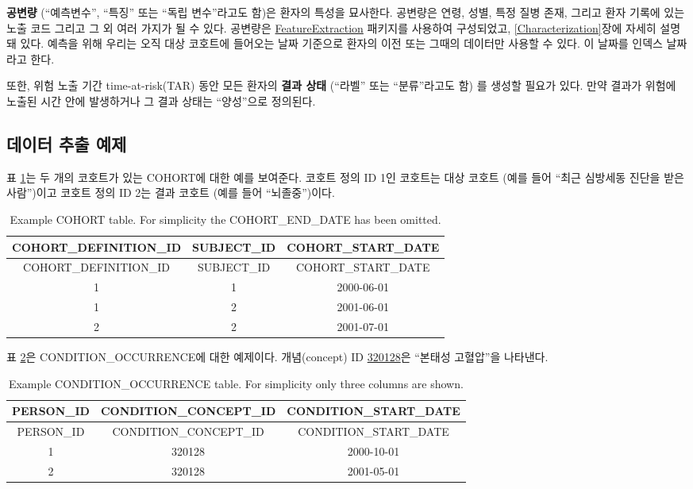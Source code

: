 \documentclass[10.5pt]{book}
\theoremstyle{definition}
\theoremstyle{definition}
\theoremstyle{definition}
\theoremstyle{remark}
\begin{document}
\textbf{공변량} (``예측변수'', ``특징'' 또는 ``독립 변수''라고도 함)은
환자의 특성을 묘사한다. 공변량은 연령, 성별, 특정 질병 존재, 그리고 환자
기록에 있는 노출 코드 그리고 그 외 여러 가지가 될 수 있다. 공변량은
\href{https://ohdsi.github.io/FeatureExtraction/}{FeatureExtraction}
패키지를 사용하여 구성되었고, \ref{Characterization}장에 자세히 설명돼
있다. 예측을 위해 우리는 오직 대상 코호트에 들어오는 날짜 기준으로
환자의 이전 또는 그때의 데이터만 사용할 수 있다. 이 날짜를 인덱스
날짜라고 한다.

또한, 위험 노출 기간 time-at-risk(TAR) 동안 모든 환자의 \textbf{결과
상태} (``라벨'' 또는 ``분류''라고도 함) 를 생성할 필요가 있다. 만약
결과가 위험에 노출된 시간 안에 발생하거나 그 결과 상태는 ``양성''으로
정의된다.  

\subsection{데이터 추출 예제}\label{--}

표 \ref{tab:plpExampleCohorts}는 두 개의 코호트가 있는 COHORT에 대한
예를 보여준다. 코호트 정의 ID 1인 코호트는 대상 코호트 (예를 들어 ``최근
심방세동 진단을 받은 사람'')이고 코호트 정의 ID 2는 결과 코호트 (예를
들어 ``뇌졸중'')이다.

\begin{longtable}[]{@{}ccc@{}}
\caption{\label{tab:plpExampleCohorts} Example COHORT table. For simplicity
the COHORT\_END\_DATE has been omitted.}\tabularnewline
\toprule
COHORT\_DEFINITION\_ID & SUBJECT\_ID &
COHORT\_START\_DATE\tabularnewline
\midrule
\endfirsthead
\toprule
COHORT\_DEFINITION\_ID & SUBJECT\_ID &
COHORT\_START\_DATE\tabularnewline
\midrule
\endhead
1 & 1 & 2000-06-01\tabularnewline
1 & 2 & 2001-06-01\tabularnewline
2 & 2 & 2001-07-01\tabularnewline
\bottomrule
\end{longtable}

표 \ref{tab:plpExampleConditions}은 CONDITION\_OCCURRENCE에 대한
예제이다. 개념(concept) ID
\href{http://athena.ohdsi.org/search-terms/terms/320128}{320128}은
``본태성 고혈압''을 나타낸다.

\begin{longtable}[]{@{}ccc@{}}
\caption{\label{tab:plpExampleConditions} Example CONDITION\_OCCURRENCE
table. For simplicity only three columns are shown.}\tabularnewline
\toprule
PERSON\_ID & CONDITION\_CONCEPT\_ID &
CONDITION\_START\_DATE\tabularnewline
\midrule
\endfirsthead
\toprule
PERSON\_ID & CONDITION\_CONCEPT\_ID &
CONDITION\_START\_DATE\tabularnewline
\midrule
\endhead
1 & 320128 & 2000-10-01\tabularnewline
2 & 320128 & 2001-05-01\tabularnewline
\bottomrule
\end{longtable}
\end{document}
